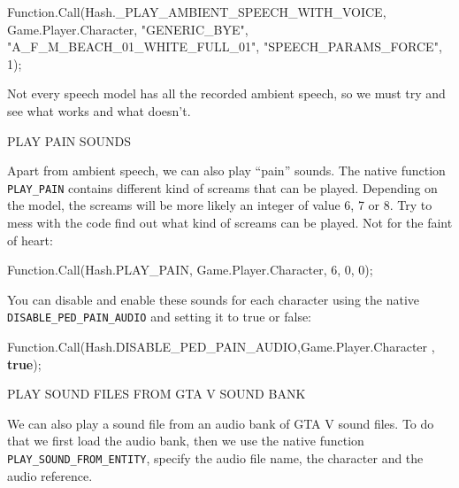 \documentclass[
  openany]{book}
\newenvironment{Shaded}{\begin{snugshade}}{\end{snugshade}}
\newcommand{\DecValTok}[1]{\textcolor[rgb]{0.00,0.00,0.81}{#1}}
\newcommand{\FunctionTok}[1]{\textcolor[rgb]{0.00,0.00,0.00}{#1}}
\newcommand{\KeywordTok}[1]{\textcolor[rgb]{0.13,0.29,0.53}{\textbf{#1}}}
\newcommand{\NormalTok}[1]{#1}
\newcommand{\StringTok}[1]{\textcolor[rgb]{0.31,0.60,0.02}{#1}}
\begin{document}
\begin{Shaded}
\begin{Highlighting}[]
\NormalTok{Function.}\FunctionTok{Call}\NormalTok{(Hash._PLAY_AMBIENT_SPEECH_WITH_VOICE, Game.}\FunctionTok{Player}\NormalTok{.}\FunctionTok{Character}\NormalTok{, }\StringTok{"GENERIC_BYE"}\NormalTok{, }\StringTok{"A_F_M_BEACH_01_WHITE_FULL_01"}\NormalTok{, }\StringTok{"SPEECH_PARAMS_FORCE"}\NormalTok{, }\DecValTok{1}\NormalTok{);}
\end{Highlighting}
\end{Shaded}

Not every speech model has all the recorded ambient speech, so we must try and see what works and what doesn't.

PLAY PAIN SOUNDS

Apart from ambient speech, we can also play ``pain'' sounds. The native function \texttt{PLAY\_PAIN} contains different kind of screams that can be played. Depending on the model, the screams will be more likely an integer of value 6, 7 or 8. Try to mess with the code find out what kind of screams can be played. Not for the faint of heart:

\begin{Shaded}
\begin{Highlighting}[]
\NormalTok{Function.}\FunctionTok{Call}\NormalTok{(Hash.}\FunctionTok{PLAY_PAIN}\NormalTok{, Game.}\FunctionTok{Player}\NormalTok{.}\FunctionTok{Character}\NormalTok{, }\DecValTok{6}\NormalTok{, }\DecValTok{0}\NormalTok{, }\DecValTok{0}\NormalTok{);}
\end{Highlighting}
\end{Shaded}

You can disable and enable these sounds for each character using the native \texttt{DISABLE\_PED\_PAIN\_AUDIO} and setting it to true or false:

\begin{Shaded}
\begin{Highlighting}[]
\NormalTok{Function.}\FunctionTok{Call}\NormalTok{(Hash.}\FunctionTok{DISABLE_PED_PAIN_AUDIO}\NormalTok{,Game.}\FunctionTok{Player}\NormalTok{.}\FunctionTok{Character}\NormalTok{ , }\KeywordTok{true}\NormalTok{);}
\end{Highlighting}
\end{Shaded}

PLAY SOUND FILES FROM GTA V SOUND BANK

We can also play a sound file from an audio bank of GTA V sound files. To do that we first load the audio bank, then we use the native function \texttt{PLAY\_SOUND\_FROM\_ENTITY}, specify the audio file name, the character and the audio reference.
\end{document}
